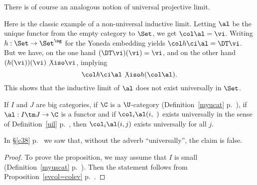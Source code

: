 \documentclass[12pt]{article}
\theoremstyle{remark}
\theoremstyle{definition}
\begin{document}
There is of course an analogous notion of universal projective limit. 

Here is the classic example of a non-universal inductive limit. Letting $\al$ be the unique functor from the empty category to $\Set$, we get $\col\al=\vi$. Writing $h:\Set\to\Set^\wg$ for the Yoneda embedding yields $\col h\ci\al=\DT\vi$. But we have, on the one hand $(\DT\vi)(\vi)=\vi$, and on the other hand $(h(\vi))(\vi)\not\iso\vi$, implying 
$$
\col h\ci\al\not\iso h(\col\al).
$$ 
This shows that the inductive limit of $\al$ does not exist universally in $\Set$.



\begin{s}
\begin{prop}
If $I$ and $J$ are big categories, if $\C$ is a $\U$-category (Definition~\ref{myucat} p.~), if $\al:I\tm J\to\C$ is a functor and if $\col_i\al(i,\ )$ exists universally in the sense of Definition~\ref{uil} p.~, then $\col_i\al(i,j)$ exists universally for all $j$. 
\end{prop}
In \S\ref{c38} p.~ we saw that, without the adverb ``universally'', the claim is false.
\begin{proof}
To prove the proposition, we may assume that $I$ is small (Definition~\ref{myuscat} p.~). %
Then the statement follows from Proposition~\ref{evcol=colev} p.~.
\end{proof}
\end{s}

%
\end{document}
